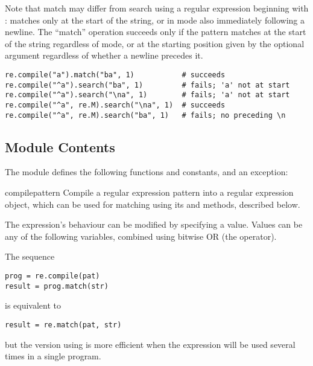 Note that match may differ from search using a regular expression
beginning with \character{\textasciicircum}:
\character{\textasciicircum} matches only at the
start of the string, or in  mode also immediately
following a newline.  The ``match'' operation succeeds only if the
pattern matches at the start of the string regardless of mode, or at
the starting position given by the optional  argument
regardless of whether a newline precedes it.

\begin{verbatim}
re.compile("a").match("ba", 1)           # succeeds
re.compile("^a").search("ba", 1)         # fails; 'a' not at start
re.compile("^a").search("\na", 1)        # fails; 'a' not at start
re.compile("^a", re.M).search("\na", 1)  # succeeds
re.compile("^a", re.M).search("ba", 1)   # fails; no preceding \n
\end{verbatim}


\subsection{Module Contents}

The module defines the following functions and constants, and an exception:


\begin{funcdesc}{compile}{pattern}
  Compile a regular expression pattern into a regular expression
  object, which can be used for matching using its  and
   methods, described below.

  The expression's behaviour can be modified by specifying a
   value.  Values can be any of the following variables,
  combined using bitwise OR (the \code{|} operator).

The sequence

\begin{verbatim}
prog = re.compile(pat)
result = prog.match(str)
\end{verbatim}

is equivalent to

\begin{verbatim}
result = re.match(pat, str)
\end{verbatim}

but the version using  is more efficient when the
expression will be used several times in a single program.
\end{funcdesc}

